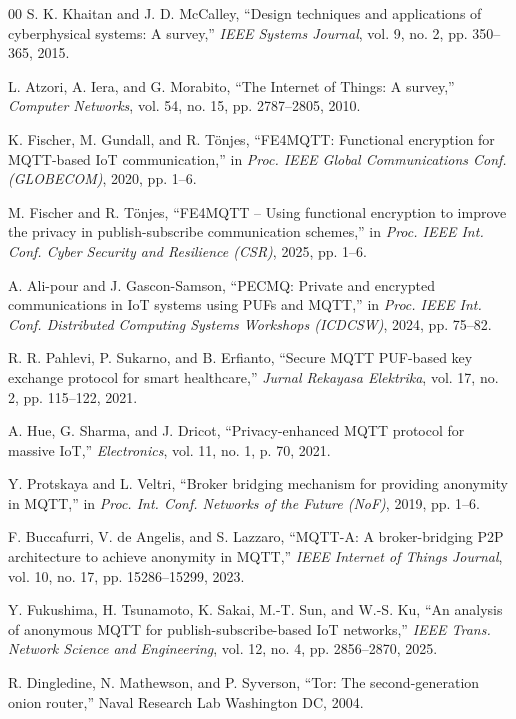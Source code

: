 \documentclass[conference]{IEEEtran}
\begin{document}
\begin{thebibliography}{00}
S. K. Khaitan and J. D. McCalley, ``Design techniques and applications of cyberphysical systems: A survey,'' \textit{IEEE Systems Journal}, vol. 9, no. 2, pp. 350--365, 2015.

L. Atzori, A. Iera, and G. Morabito, ``The Internet of Things: A survey,'' \textit{Computer Networks}, vol. 54, no. 15, pp. 2787--2805, 2010.

K. Fischer, M. Gundall, and R. T\"{o}njes, ``FE4MQTT: Functional encryption for MQTT-based IoT communication,'' in \textit{Proc. IEEE Global Communications Conf. (GLOBECOM)}, 2020, pp. 1--6.

M. Fischer and R. T\"{o}njes, ``FE4MQTT -- Using functional encryption to improve the privacy in publish-subscribe communication schemes,'' in \textit{Proc. IEEE Int. Conf. Cyber Security and Resilience (CSR)}, 2025, pp. 1--6.

A. Ali-pour and J. Gascon-Samson, ``PECMQ: Private and encrypted communications in IoT systems using PUFs and MQTT,'' in \textit{Proc. IEEE Int. Conf. Distributed Computing Systems Workshops (ICDCSW)}, 2024, pp. 75--82.

R. R. Pahlevi, P. Sukarno, and B. Erfianto, ``Secure MQTT PUF-based key exchange protocol for smart healthcare,'' \textit{Jurnal Rekayasa Elektrika}, vol. 17, no. 2, pp. 115--122, 2021.

A. Hue, G. Sharma, and J. Dricot, ``Privacy-enhanced MQTT protocol for massive IoT,'' \textit{Electronics}, vol. 11, no. 1, p. 70, 2021.

Y. Protskaya and L. Veltri, ``Broker bridging mechanism for providing anonymity in MQTT,'' in \textit{Proc. Int. Conf. Networks of the Future (NoF)}, 2019, pp. 1--6.

F. Buccafurri, V. de Angelis, and S. Lazzaro, ``MQTT-A: A broker-bridging P2P architecture to achieve anonymity in MQTT,'' \textit{IEEE Internet of Things Journal}, vol. 10, no. 17, pp. 15286--15299, 2023.

Y. Fukushima, H. Tsunamoto, K. Sakai, M.-T. Sun, and W.-S. Ku, ``An analysis of anonymous MQTT for publish-subscribe-based IoT networks,'' \textit{IEEE Trans. Network Science and Engineering}, vol. 12, no. 4, pp. 2856--2870, 2025.

R. Dingledine, N. Mathewson, and P. Syverson, ``Tor: The second-generation onion router,'' Naval Research Lab Washington DC, 2004.


\end{thebibliography}
\end{document}

